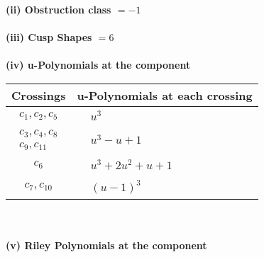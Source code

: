 \documentclass[1p]{elsarticle_modified}
\theoremstyle{definition}
\begin{document}
\flushleft \textbf{(ii) Obstruction class $= -1$}\\~\\
\flushleft \textbf{(iii) Cusp Shapes $= 6$}\\~\\
\newpage\renewcommand{\arraystretch}{1}
\flushleft \textbf{(iv) u-Polynomials at the component}\newline \\
\begin{tabular}{m{50pt}|m{274pt}}
Crossings & \hspace{64pt}u-Polynomials at each crossing \\
\hline $$\begin{aligned}c_{1},c_{2},c_{5}\end{aligned}$$&$\begin{aligned}
&u^3
\end{aligned}$\\
\hline $$\begin{aligned}c_{3},c_{4},c_{8}\\c_{9},c_{11}\end{aligned}$$&$\begin{aligned}
&u^3- u+1
\end{aligned}$\\
\hline $$\begin{aligned}c_{6}\end{aligned}$$&$\begin{aligned}
&u^3+2 u^2+u+1
\end{aligned}$\\
\hline $$\begin{aligned}c_{7},c_{10}\end{aligned}$$&$\begin{aligned}
&(u-1)^3
\end{aligned}$\\
\hline
\end{tabular}\\~\\
\newpage\renewcommand{\arraystretch}{1}
\flushleft \textbf{(v) Riley Polynomials at the component}\newline \\
\end{document}
